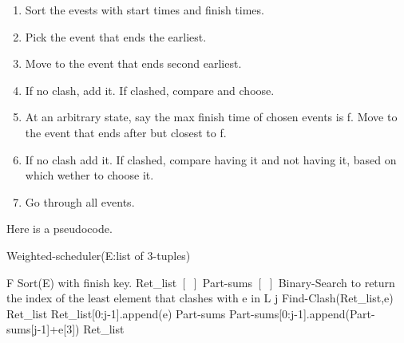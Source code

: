 \documentclass{myclass}
\begin{document}
\begin{enumerate}
    \item Sort the evests with start times and finish times.
    \item Pick the event that ends the earliest.
    \item Move to the event that ends second earliest.
    \item If no clash, add it. If clashed, compare and choose.
    \item At an arbitrary state, say the max finish time of chosen events is f. Move to the event that ends after but closest to f. 
    \item If no clash add it. If clashed, compare having it and not having it, based on which wether to choose it.
    \item Go through all events.
\end{enumerate}

Here is a pseudocode.

\begin{algorithm}
    \caption*{Weighted-scheduler(E:list of 3-tuples)}
    \begin{algorithmic}[1]
        \State F \ass Sort(E) with finish key.
        \State Ret\_list \ass $[\,\,]$
        \State Part-sums \ass $[\,\,]$
            \State Binary-Search to return the index of the least element that clashes with e in L
        \EndProcedure
            j \ass Find-Clash(Ret\_list,e) 
                \State Ret\_list \ass Ret\_list[0:j-1].append(e)
                \State Part-sums \ass Part-sums[0:j-1].append(Part-sums[j-1]+e[3])
            \EndIf
        \EndFor
         Ret\_list
    \end{algorithmic}
\end{algorithm}
\end{document}
